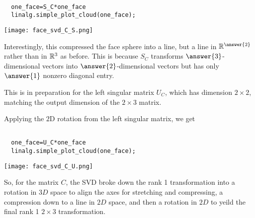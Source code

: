 \documentclass{ximera}
\begin{document}
\begin{problem}
\begin{verbatim}

  one_face=S_C*one_face
  linalg.simple_plot_cloud(one_face);

\end{verbatim}

\begin{center}
  \texttt{[image: face\_svd\_C\_S.png]}
\end{center}

Interestingly, this compressed the face sphere into a line, but a line in $\RR^{\answer{2}}$ rather than in $\mathbb{R}^3$ as before. This is because $S_C$ transforms $\answer{3}$-dimensional vectors into $\answer{2}$-dimensional vectors but has only $\answer{1}$ nonzero diagonal entry.



 This is in preparation for the left singular matrix $U_C$, which has dimension $2\times 2$, matching the output dimension of the $2\times 3$ matrix. 

Applying the $2$D rotation from the left singular matrix, we get

\begin{verbatim}

  one_face=U_C*one_face
  linalg.simple_plot_cloud(one_face);

\end{verbatim}

\begin{center}
  \texttt{[image: face\_svd\_C\_U.png]}
\end{center}

\end{problem}

So, for the matrix $C$, the SVD broke down the rank 1 transformation into a rotation in $3D$ space to align the axes for stretching and compressing, a compression down to a line in $2D$ space, and then a rotation in $2D$ to yeild the final rank 1 $2\times 3$ transformation. 
\end{document}
